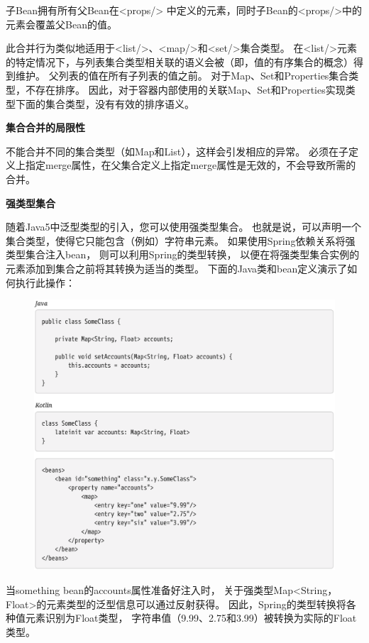 子Bean拥有所有父Bean在<props/> 中定义的元素，同时子Bean的<props/>中的元素会覆盖父Bean的值。

此合并行为类似地适用于<list/>、<map/>和<set/>集合类型。
在<list/>元素的特定情况下，与列表集合类型相关联的语义会被（即，值的有序集合的概念）得到维护。
父列表的值在所有子列表的值之前。
对于Map、Set和Properties集合类型，不存在排序。
因此，对于容器内部使用的关联Map、Set和Properties实现类型下面的集合类型，没有有效的排序语义。

\noindent \small \textbf{集合合并的局限性}

不能合并不同的集合类型（如Map和List），这样会引发相应的异常。
必须在子定义上指定merge属性，在父集合定义上指定merge属性是无效的，不会导致所需的合并。

\noindent \small  \textbf{强类型集合}

随着Java5中泛型类型的引入，您可以使用强类型集合。
也就是说，可以声明一个集合类型，使得它只能包含（例如）字符串元素。
如果使用Spring依赖关系将强类型集合注入bean，
则可以利用Spring的类型转换，
以便在将强类型集合实例的元素添加到集合之前将其转换为适当的类型。
下面的Java类和bean定义演示了如何执行此操作：

\begin{figure}[ht]
    \centering
    \includegraphics[width=1\linewidth]{./Figure/IMG_code_45.png}
\end{figure}

当something bean的accounts属性准备好注入时，
关于强类型Map<String，Float>的元素类型的泛型信息可以通过反射获得。
因此，Spring的类型转换将各种值元素识别为Float类型，
字符串值（9.99、2.75和3.99）被转换为实际的Float类型。

